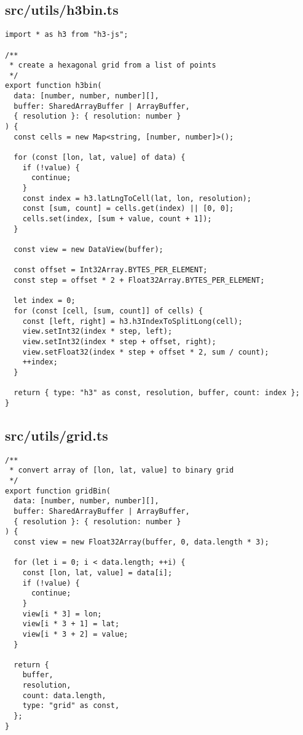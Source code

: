 \subsection{src/utils/h3bin.ts}
\begin{verbatim}
import * as h3 from "h3-js";

/**
 * create a hexagonal grid from a list of points
 */
export function h3bin(
  data: [number, number, number][],
  buffer: SharedArrayBuffer | ArrayBuffer,
  { resolution }: { resolution: number }
) {
  const cells = new Map<string, [number, number]>();

  for (const [lon, lat, value] of data) {
    if (!value) {
      continue;
    }
    const index = h3.latLngToCell(lat, lon, resolution);
    const [sum, count] = cells.get(index) || [0, 0];
    cells.set(index, [sum + value, count + 1]);
  }

  const view = new DataView(buffer);

  const offset = Int32Array.BYTES_PER_ELEMENT;
  const step = offset * 2 + Float32Array.BYTES_PER_ELEMENT;

  let index = 0;
  for (const [cell, [sum, count]] of cells) {
    const [left, right] = h3.h3IndexToSplitLong(cell);
    view.setInt32(index * step, left);
    view.setInt32(index * step + offset, right);
    view.setFloat32(index * step + offset * 2, sum / count);
    ++index;
  }

  return { type: "h3" as const, resolution, buffer, count: index };
}

\end{verbatim}
\subsection{src/utils/grid.ts}
\begin{verbatim}
/**
 * convert array of [lon, lat, value] to binary grid
 */
export function gridBin(
  data: [number, number, number][],
  buffer: SharedArrayBuffer | ArrayBuffer,
  { resolution }: { resolution: number }
) {
  const view = new Float32Array(buffer, 0, data.length * 3);

  for (let i = 0; i < data.length; ++i) {
    const [lon, lat, value] = data[i];
    if (!value) {
      continue;
    }
    view[i * 3] = lon;
    view[i * 3 + 1] = lat;
    view[i * 3 + 2] = value;
  }

  return {
    buffer,
    resolution,
    count: data.length,
    type: "grid" as const,
  };
}

\end{verbatim}
